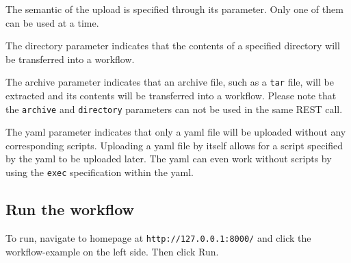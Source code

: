 The semantic of the upload is specified through its parameter. Only one
of them can be used at a time.

The directory parameter indicates that the contents of a specified
directory will be transferred into a workflow.

The archive parameter indicates that an archive file, such as a
\texttt{tar} file, will be extracted and its contents will be
transferred into a workflow. Please note that the \texttt{archive} and
\texttt{directory} parameters can not be used in the same REST call.

The yaml parameter indicates that only a yaml file will be uploaded
without any corresponding scripts. Uploading a yaml file by itself
allows for a script specified by the yaml to be uploaded later. The yaml
can even work without scripts by using the \texttt{exec} specification
within the yaml.

\subsection{Run the workflow}\label{run-the-workflow}

To run, navigate to homepage at \texttt{http://127.0.0.1:8000/} and
click the workflow-example on the left side. Then click Run.
